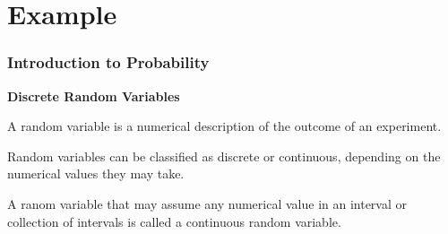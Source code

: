 \documentclass[IntroMain.tex]{subfiles}
\begin{document}
\section*{Example}

\begin{frame}
	\frametitle{Introduction to Probability}
	\Large
	\textbf{Discrete Random Variables}
	
	A random variable is a numerical description of the outcome of an experiment.
	
	Random variables can be classified as discrete or continuous, depending on the numerical values they may take.
	
	A ranom variable that may assume any numerical value in an interval or collection of intervals is called a continuous random variable.
\end{frame}
\end{document}
